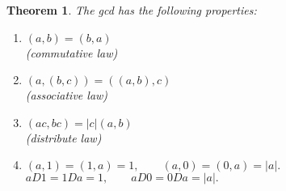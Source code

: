 \documentclass[11pt]{article}
\newtheorem{theorem}{Theorem}
\begin{document}
\begin{theorem}
  The gcd has the following properties:
  \begin{enumerate}
  \item \((a,b) = (b,a)\)\\
     (commutative law)
  \item \((a,(b,c)) = ((a,b),c)\)\\
     (associative law)
  \item \((ac,bc) = |c|(a,b)\)\\
     (distribute law)
  \item \((a,1) = (1,a) = 1, \qquad (a,0) = (0,a) = |a|.\)\\
    \(aD1 = 1Da = 1, \qquad aD0 = 0Da = |a|.\)
  \end{enumerate}
\end{theorem}
\end{document}
